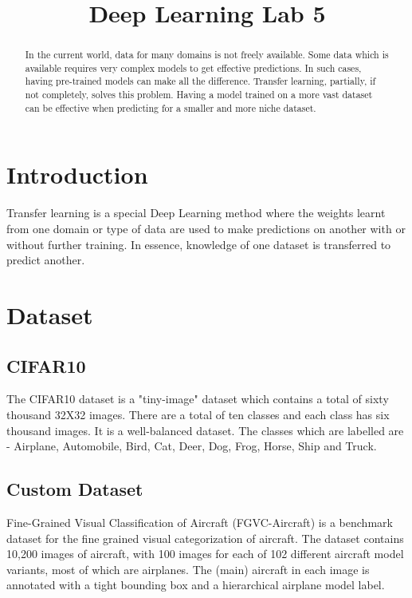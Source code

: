 \documentclass[conference,compsoc]{IEEEtran}
\begin{document}
\title{Deep Learning Lab 5}
\author{}

\maketitle
\begin{abstract}
    In the current world, data for many domains is not freely available. Some data which is available requires very complex models to get effective predictions. In such cases, having pre-trained models can make all the difference. Transfer learning, partially, if not completely, solves this problem. Having a model trained on a more vast dataset can be effective when predicting for a smaller and more niche dataset.
\end{abstract}

\section{Introduction}
Transfer learning is a special Deep Learning method where the weights learnt from one domain or type of data are used to make predictions on another with or without further training. In essence, knowledge of one dataset is transferred to predict another.

\section{Dataset}
\subsection{CIFAR10}
The CIFAR10 dataset is a "tiny-image" dataset which contains a total of sixty thousand 32X32 images. There are a total of ten classes and each class has six thousand images. It is a well-balanced dataset. The classes which are labelled are - Airplane, Automobile, Bird, Cat, Deer, Dog, Frog, Horse, Ship and Truck.

\subsection{Custom Dataset}
Fine-Grained Visual Classification of Aircraft (FGVC-Aircraft) is a benchmark dataset for the fine grained visual categorization of aircraft. The dataset contains 10,200 images of aircraft, with 100 images for each of 102 different aircraft model variants, most of which are airplanes. The (main) aircraft in each image is annotated with a tight bounding box and a hierarchical airplane model label.
\end{document}
